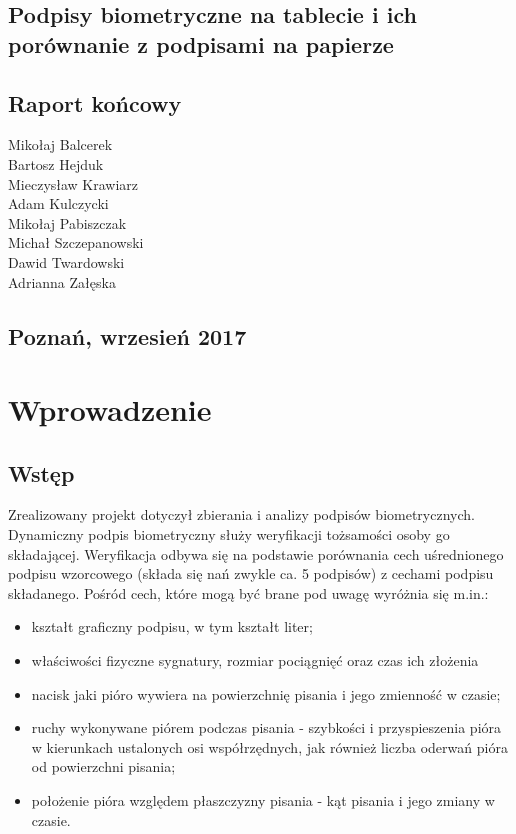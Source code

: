 \documentclass[notitlepage, oneside]{report}
\begin{document}
 
\vline\break
\begin{center}
\section*{{\LARGE Podpisy biometryczne na tablecie i ich porównanie  z podpisami na papierze}}
\section*{{\Large Raport końcowy}}

{\Large Mikołaj Balcerek \\ Bartosz Hejduk \\ Mieczysław Krawiarz \\ Adam Kulczycki \\ Mikołaj Pabiszczak \\ Michał Szczepanowski \\ Dawid Twardowski \\ Adrianna Załęska \\}
   
\section*{Poznań, wrzesień 2017}
\end{center}

\chapter*{Wprowadzenie}
 \section*{Wstęp}
 Zrealizowany projekt dotyczył zbierania i analizy podpisów biometrycznych. Dynamiczny podpis biometryczny służy weryfikacji tożsamości osoby go składającej. Weryfikacja odbywa się na podstawie porównania cech uśrednionego podpisu wzorcowego (składa się nań zwykle ca. 5 podpisów) z cechami podpisu składanego. Pośród cech, które mogą być brane pod uwagę wyróżnia się m.in.:
 \begin{itemize}
 	\item kształt graficzny podpisu, w tym kształt liter;
 	\item właściwości fizyczne sygnatury, rozmiar pociągnięć oraz czas ich złożenia
 	\item nacisk jaki pióro wywiera na powierzchnię pisania i jego zmienność w czasie;
 	\item ruchy wykonywane piórem podczas pisania - szybkości i przyspieszenia pióra w kierunkach ustalonych osi współrzędnych, jak również liczba oderwań pióra od powierzchni pisania;
 	\item położenie pióra względem płaszczyzny pisania -  kąt pisania i jego zmiany w czasie.
 \end{itemize}
\end{document}
